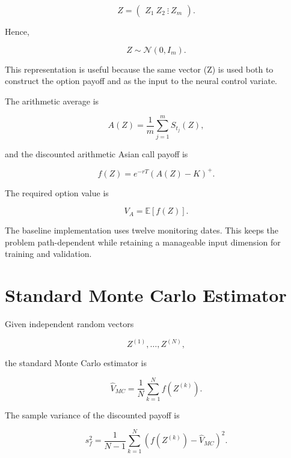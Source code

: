 \documentclass[12pt,a4paper]{report}
\begin{document}
\begin{equation}
Z
=
\begin{pmatrix}
Z_1\
Z_2\
\vdots\
Z_m
\end{pmatrix}.
\end{equation}

Hence,

\begin{equation}
Z
\sim
\mathcal{N}(0,I_m).
\end{equation}

This representation is useful because the same vector (Z) is used both to construct the option payoff and as the input to the neural control variate.

The arithmetic average is

\begin{equation}
A(Z)
=
\frac{1}{m}
\sum_{j=1}^{m}
S_{t_j}(Z),
\end{equation}

and the discounted arithmetic Asian call payoff is

\begin{equation}
f(Z)
=
e^{-rT}
\left(
A(Z)-K
\right)^+.
\end{equation}

The required option value is

\begin{equation}
V_A
=
\mathbb{E}[f(Z)].
\end{equation}

The baseline implementation uses twelve monitoring dates. This keeps the problem path-dependent while retaining a manageable input dimension for training and validation.

\section{Standard Monte Carlo Estimator}

Given independent random vectors

\begin{equation}
Z^{(1)},\ldots,Z^{(N)},
\end{equation}

the standard Monte Carlo estimator is

\begin{equation}
\widehat V_{MC}
=
\frac{1}{N}
\sum_{k=1}^{N}
f(Z^{(k)}).
\end{equation}

The sample variance of the discounted payoff is

\begin{equation}
s_f^2
=
\frac{1}{N-1}
\sum_{k=1}^{N}
\left(
f(Z^{(k)})
-
\widehat V_{MC}
\right)^2.
\end{equation}
\end{document}
